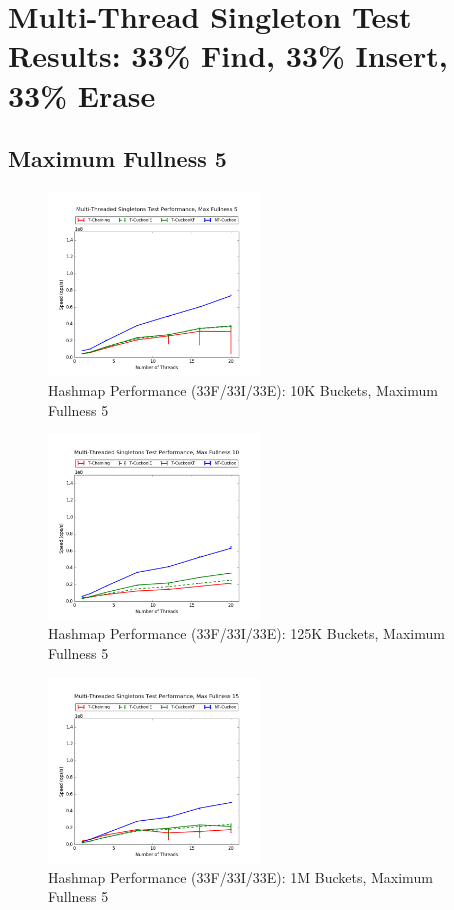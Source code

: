 \newpage
\section{Multi-Thread Singleton Test Results: 33\% Find, 33\% Insert, 33\% Erase}

\subsection{Maximum Fullness 5}

\begin{figure}[H]
    \centering
    \caption{Hashmap Performance (33F/33I/33E): 10K Buckets, Maximum Fullness 5}
    \includegraphics[width=0.5\textwidth]{maps/5HM10K:F34,I33,E33.png} 
    
\end{figure}

\begin{figure}[H]
    \centering
    \caption{Hashmap Performance (33F/33I/33E): 125K Buckets, Maximum Fullness 5}
    \includegraphics[width=0.5\textwidth]{maps/10HM125K:F34,I33,E33.png} 
    
\end{figure}

\begin{figure}[H]
    \centering
    \caption{Hashmap Performance (33F/33I/33E): 1M Buckets, Maximum Fullness 5}
    \includegraphics[width=0.5\textwidth]{maps/15HM1M:F34,I33,E33.png} 
    
\end{figure}

